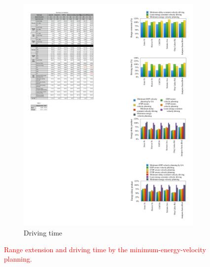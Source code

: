 \documentclass{IEEEtran}
\begin{document}
\begin{figure}
\begin{subfigure}{0.45\textwidth}
	\includegraphics[width=\hsize]{Figures/driving_time_comp_bar.pdf}
	\caption{Driving time}
	\label{fig:driving_time_comp}
	\end{subfigure}
\caption{\textcolor{red}{Range extension and driving time by the minimum-energy-velocity planning.}}
\label{fig:min_energy_planning_comp}
\end{figure}
\end{document}
